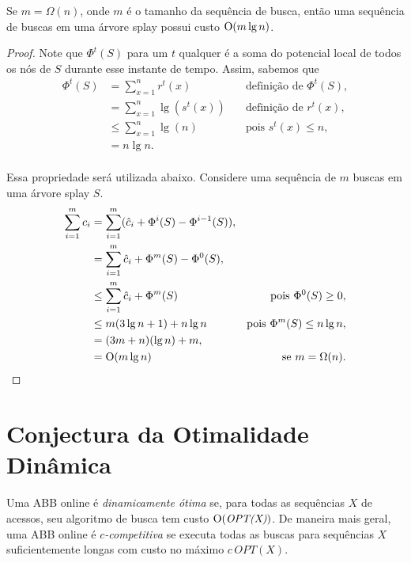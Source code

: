 \begin{theorem}
    Se $m = \Omega(n)$, onde $m$ é o tamanho da sequência de busca, então uma sequência de buscas em uma árvore splay possui custo $\mathrm{O}(m \lg n)$.
\end{theorem}

\begin{proof}
Note que $\Phi^{t}(S)$ para um $t$ qualquer é a soma do potencial local de todos os nós de $S$ durante esse instante de tempo. Assim, sabemos que 
\begin{align*}
    \Phi^{t}(S) &= \sum_{x = 1}^{n}r^{t}(x) \quad & \text{definição de $\Phi^{t}(S)$},\\
    &= \sum_{x = 1}^{n}\lg(s^{t}(x)) \quad & \text{definição de $r^{t}(x)$},\\
    &\leq \sum_{x = 1}^{n}\lg(n) \quad & \text{pois $s^{t}(x) \leq n$},\\
    &= n\lg n.\\
\end{align*}

Essa propriedade será utilizada abaixo. Considere uma sequência de $m$ buscas em uma árvore splay $S$.
\begin{align*}
    \sum_{i = 1}^{m} c_i &= \sum_{i = 1}^{m} (\hat{c}_i + \Phi^{i}(S) - \Phi^{i-1}(S)),\\
    &= \sum_{i = 1}^{m} \hat{c}_i + \Phi^{m}(S) - \Phi^{0}(S),\\
    &\leq \sum_{i = 1}^{m} \hat{c}_i + \Phi^{m}(S) \quad & \text{pois $\Phi^{0}(S) \geq 0$},\\
    &\leq m(3\lg n + 1) + n\lg n \quad & \text{pois $\Phi^{m}(S) \leq n\lg n$},\\
    &= (3m + n)(\lg n) + m, \\
    &= \mathrm{O}(m \lg n) \quad & \text{se $m = \Omega(n)$}.
\end{align*}
\end{proof}

\section{Conjectura da Otimalidade Dinâmica}

Uma ABB online é \textit{dinamicamente ótima} se, para todas as sequências $X$ de acessos, seu algoritmo de busca tem custo $\mathrm{O}(\textit{OPT(X)})$. De maneira mais geral, uma ABB online é \textit{$c$-competitiva} se executa todas as buscas para sequências $X$ suficientemente longas com custo no máximo $c$\,$OPT(X)$.

